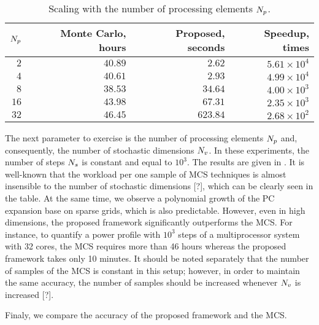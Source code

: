 \begin{table}
  \centering
  \caption{Scaling with the number of processing elements ${N_p}$.}
  \vspace{-10pt}
  \begin{tabular}{|r|r|r|r|}
    \hline
    ${N_p}$ & Monte Carlo, hours & Proposed, seconds & Speedup, times \\
    \hline
    $ 2$ & $40.89$ & $  2.62$ & $5.61 \times 10^4$ \\
    $ 4$ & $40.61$ & $  2.93$ & $4.99 \times 10^4$ \\
    $ 8$ & $38.53$ & $ 34.64$ & $4.00 \times 10^3$ \\
    $16$ & $43.98$ & $ 67.31$ & $2.35 \times 10^3$ \\
    $32$ & $46.45$ & $623.84$ & $2.68 \times 10^2$ \\
    \hline
  \end{tabular}
  \vspace{-10pt}
\end{table}
The next parameter to exercise is the number of processing elements ${N_p}$ and, consequently, the number of stochastic dimensions ${N_v}$. In these experiments, the number of steps ${N_s}$ is constant and equal to $10^3$. The results are given in . It is well-known that the workload per one sample of MCS techniques is almost insensible to the number of stochastic dimensions [?], which can be clearly seen in the table. At the same time, we observe a polynomial growth \cite{heiss2008} of the PC expansion base on sparse grids, which is also predictable. However, even in high dimensions, the proposed framework significantly outperforms the MCS. For instance, to quantify a power profile with $10^3$ steps of a multiprocessor system with 32 cores, the MCS requires more than 46 hours whereas the proposed framework takes only 10 minutes. It should be noted separately that the number of samples of the MCS is constant in this setup; however, in order to maintain the same accuracy, the number of samples should be increased whenever ${N_v}$ is increased [?].

Finaly, we compare the accuracy of the proposed framework and the MCS.

